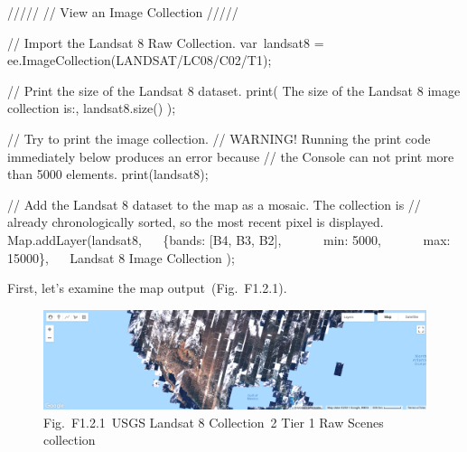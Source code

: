 \documentclass[
  letterpaper,
  DIV=11,
  numbers=noendperiod]{scrreprt}
\newenvironment{Shaded}{\begin{snugshade}}{\end{snugshade}}
\newcommand{\AlertTok}[1]{\textcolor[rgb]{0.68,0.00,0.00}{#1}}
\newcommand{\BuiltInTok}[1]{\textcolor[rgb]{0.00,0.23,0.31}{#1}}
\newcommand{\CommentTok}[1]{\textcolor[rgb]{0.37,0.37,0.37}{#1}}
\newcommand{\DataTypeTok}[1]{\textcolor[rgb]{0.68,0.00,0.00}{#1}}
\newcommand{\DecValTok}[1]{\textcolor[rgb]{0.68,0.00,0.00}{#1}}
\newcommand{\FunctionTok}[1]{\textcolor[rgb]{0.28,0.35,0.67}{#1}}
\newcommand{\NormalTok}[1]{\textcolor[rgb]{0.00,0.23,0.31}{#1}}
\newcommand{\OperatorTok}[1]{\textcolor[rgb]{0.37,0.37,0.37}{#1}}
\newcommand{\StringTok}[1]{\textcolor[rgb]{0.13,0.47,0.30}{#1}}
\begin{document}
\begin{Shaded}
\begin{Highlighting}[]
\CommentTok{/////  }
\CommentTok{// View an Image Collection  }
\CommentTok{/////  }
  
\CommentTok{// Import the Landsat 8 Raw Collection.  }
\NormalTok{var landsat8 }\OperatorTok{=}\NormalTok{ ee}\OperatorTok{.}\FunctionTok{ImageCollection}\NormalTok{(}\StringTok{\textquotesingle{}LANDSAT/LC08/C02/T1\textquotesingle{}}\NormalTok{)}\OperatorTok{;}  
  
\CommentTok{// Print the size of the Landsat 8 dataset.  }
\FunctionTok{print}\NormalTok{(}
    \StringTok{\textquotesingle{}The size of the Landsat 8 image collection is:\textquotesingle{}}\OperatorTok{,} 
\NormalTok{    landsat8}\OperatorTok{.}\FunctionTok{size}\NormalTok{()}
\NormalTok{    )}\OperatorTok{;}  
  
\CommentTok{// Try to print the image collection.  }
\CommentTok{// }\AlertTok{WARNING}\CommentTok{! Running the print code immediately below produces an error because  }
\CommentTok{// the Console can not print more than 5000 elements.  }
\FunctionTok{print}\NormalTok{(landsat8)}\OperatorTok{;}  
  
\CommentTok{// Add the Landsat 8 dataset to the map as a mosaic. The collection is  }
\CommentTok{// already chronologically sorted, so the most recent pixel is displayed.  }
\BuiltInTok{Map}\OperatorTok{.}\FunctionTok{addLayer}\NormalTok{(landsat8}\OperatorTok{,}  
\NormalTok{   \{}\DataTypeTok{bands}\OperatorTok{:}\NormalTok{ [}\StringTok{\textquotesingle{}B4\textquotesingle{}}\OperatorTok{,} \StringTok{\textquotesingle{}B3\textquotesingle{}}\OperatorTok{,} \StringTok{\textquotesingle{}B2\textquotesingle{}}\NormalTok{]}\OperatorTok{,}  
      \DataTypeTok{ min}\OperatorTok{:} \DecValTok{5000}\OperatorTok{,}  
      \DataTypeTok{ max}\OperatorTok{:} \DecValTok{15000}\NormalTok{\}}\OperatorTok{,}   
    \StringTok{\textquotesingle{}Landsat 8 Image Collection\textquotesingle{}}
\NormalTok{    )}\OperatorTok{;}
\end{Highlighting}
\end{Shaded}

First, let's examine the map output~(Fig.~F1.2.1).

\begin{figure}

{\centering \includegraphics{./F1/image18.png}

}

\caption{Fig.~F1.2.1~USGS Landsat 8 Collection~2 Tier 1 Raw Scenes
collection}

\end{figure}
\end{document}
